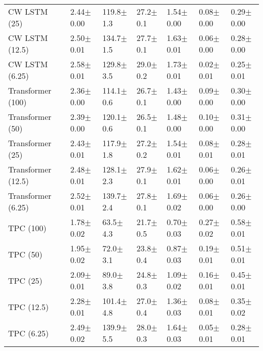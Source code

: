 \documentclass[sigconf]{acmart}
\begin{document}
\begin{table*}[ht]
\begin{tabular}{p{2.9cm}|p{1.3cm}p{1.3cm}p{1.3cm}p{1.3cm}p{1.3cm}p{1.3cm}}
        CW LSTM (25) & {2.44$\pm$0.00} & {119.8$\pm$1.3} & {27.2$\pm$0.1} & {1.54$\pm$0.00} & {0.08$\pm$0.00} & {0.29$\pm$0.00} \\
        CW LSTM (12.5) & {2.50$\pm$0.01} & {134.7$\pm$1.5} & {27.7$\pm$0.1} & {1.63$\pm$0.01} & {0.06$\pm$0.00} & {0.28$\pm$0.00} \\
        CW LSTM (6.25) & {2.58$\pm$0.01} & {129.8$\pm$3.5} & {29.0$\pm$0.2} & {1.73$\pm$0.01} & {0.02$\pm$0.01} & {0.25$\pm$0.01} \\
    \midrule
        Transformer (100) & {2.36$\pm$0.00} & {114.1$\pm$0.6} & {26.7$\pm$0.1} & {1.43$\pm$0.00} & {0.09$\pm$0.00} & {0.30$\pm$0.00} \\
        Transformer (50) & {2.39$\pm$0.00} & {120.1$\pm$0.6} & {26.5$\pm$0.1} & {1.48$\pm$0.00} & {0.10$\pm$0.00} & {0.31$\pm$0.00} \\
        Transformer (25) & {2.43$\pm$0.01} & {117.9$\pm$1.8} & {27.2$\pm$0.2} & {1.54$\pm$0.01} & {0.08$\pm$0.01} & {0.28$\pm$0.01} \\
        Transformer (12.5) & {2.48$\pm$0.01} & {128.1$\pm$2.3} & {27.9$\pm$0.1} & {1.62$\pm$0.01} & {0.06$\pm$0.00} & {0.26$\pm$0.01} \\
        Transformer (6.25) & {2.52$\pm$0.01} & {139.7$\pm$2.4} & {27.8$\pm$0.1} & {1.69$\pm$0.02} & {0.06$\pm$0.00} & {0.26$\pm$0.00} \\
    \midrule
        TPC (100) & {1.78$\pm$0.02} & {63.5$\pm$4.3} & {21.7$\pm$0.5} & {0.70$\pm$0.03} & {0.27$\pm$0.02} & {0.58$\pm$0.01} \\
        TPC (50) & {1.95$\pm$0.02} & {72.0$\pm$3.1} & {23.8$\pm$0.4} & {0.87$\pm$0.03} & {0.19$\pm$0.01} & {0.51$\pm$0.01} \\
        TPC (25) & {2.09$\pm$0.01} & {89.0$\pm$3.8} & {24.8$\pm$0.3} & {1.09$\pm$0.02} & {0.16$\pm$0.01} & {0.45$\pm$0.01} \\
        TPC (12.5) & {2.28$\pm$0.01} & {101.4$\pm$4.8} & {27.0$\pm$0.4} & {1.36$\pm$0.03} & {0.08$\pm$0.01} & {0.35$\pm$0.02} \\
        TPC (6.25) & {2.49$\pm$0.02} & {139.9$\pm$5.5} & {28.0$\pm$0.3} & {1.64$\pm$0.03} & {0.05$\pm$0.01} & {0.28$\pm$0.01} \\
    \bottomrule
    \end{tabular}
\end{table*}
\end{document}
